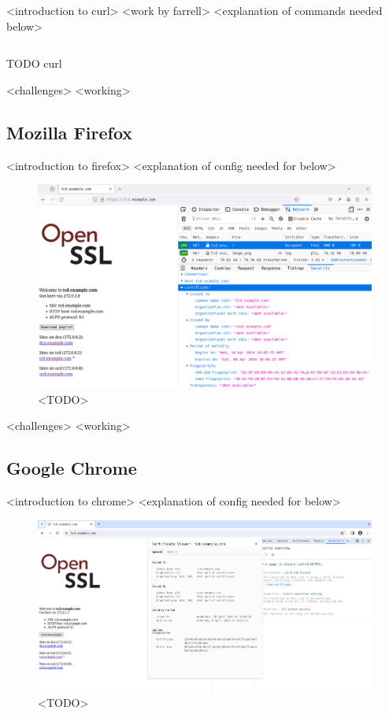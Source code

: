 <introduction to curl>
<work by farrell>
<explanation of commands needed below>

\begin{listing}[ht]
\inputminted{nginx}{snippets/curl.bash}
\caption[Command to use ECH-enabled curl on QEMU virtual machines]{TODO curl}
\end{listing}

<challenges>
<working>

\subsection{Mozilla Firefox}

<introduction to firefox>
<explanation of config needed for below>

\begin{figure}[ht]
\centerline{\includegraphics[width=120mm]{images/firefox.png}}
\caption[Screenshot of Mozilla Firefox when accessing tcd.example.com]{<TODO>}
\label{firefox_screenshot_figure}
\end{figure}

<challenges>
<working>

\subsection{Google Chrome}

<introduction to chrome>
<explanation of config needed for below>

\begin{figure}[ht]
\centerline{\includegraphics[width=120mm]{images/chrome.png}}
\caption[Screenshot of Google Chrome when accessing tcd.example.com]{<TODO>}
\label{chrome_screenshot_figure}
\end{figure}

